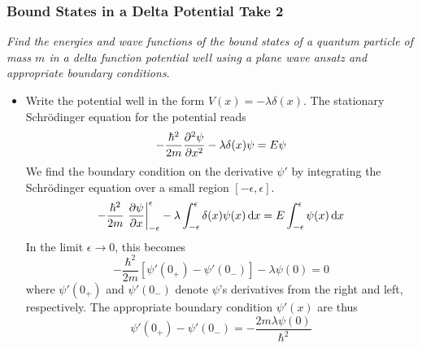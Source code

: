 \documentclass[11pt, a4paper]{article}
\newcommand{\diff}{\mathop{}\!\mathrm{d}} %
\newcommand{\schro}{Schr\"{o}dinger\xspace}
\begin{document}
\subsubsection{Bound States in a Delta Potential Take 2}
\textit{Find the energies and wave functions of the bound states of a quantum particle of mass $ m $ in a delta function potential well using a plane wave ansatz and appropriate boundary conditions}. 
\begin{itemize}
	\item Write the potential well in the form $ V(x) = - \lambda \delta (x) $. The stationary \schro equation for the potential reads
	\begin{equation*}
		- \frac{\hbar^{2}}{2m}\pdv[2]{\psi}{x} - \lambda \delta(x) \psi = E\psi
	\end{equation*}
	We find the boundary condition on the derivative $ \psi' $ by integrating the \schro equation over a small region $ [-\epsilon, \epsilon] $. 
	\begin{equation*}
		-\frac{\hbar^{2}}{2m} \eval{\pdv{\psi}{x}}_{-\epsilon}^{\epsilon} - \lambda \int_{-\epsilon}^{\epsilon} \delta(x) \psi(x)\diff x = E \int_{-\epsilon}^{\epsilon}\psi(x) \diff x
	\end{equation*}
	In the limit $ \epsilon \to 0 $, this becomes
	\begin{equation*}
		-\frac{\hbar^{2}}{2m} \left[\psi'(0_{+}) - \psi'(0_{-})\right] - \lambda \psi(0) = 0
	\end{equation*}
	where $ \psi'(0_{+}) $ and $ \psi'(0_{-}) $ denote $ \psi $'s derivatives from the right and left, respectively. The appropriate boundary condition $ \psi'(x) $ are thus
	\begin{equation*}
		\psi'(0_{+}) - \psi'(0_{-}) = -\frac{2m\lambda\psi(0)}{\hbar^{2}}
	\end{equation*}
	

\end{itemize}
\end{document}
